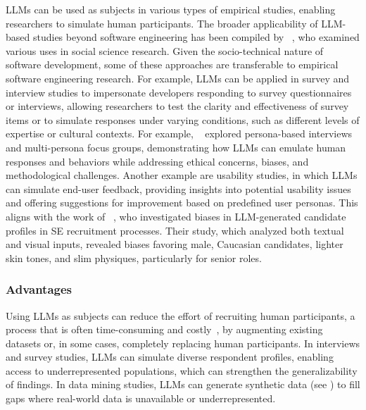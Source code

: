 LLMs can be used as subjects in various types of empirical studies, enabling researchers to simulate human participants.
The broader applicability of LLM-based studies beyond software engineering has been compiled by \citeauthor{DBLP:journals/ipm/XuSRGPLSH24}~\cite{DBLP:journals/ipm/XuSRGPLSH24}, who examined various uses in social science research.
Given the socio-technical nature of software development, some of these approaches are transferable to empirical software engineering research.
For example, LLMs can be applied in survey and interview studies to impersonate developers responding to survey questionnaires or interviews, allowing researchers to test the clarity and effectiveness of survey items or to simulate responses under varying conditions, such as different levels of expertise or cultural contexts.
For example, \citeauthor{DBLP:journals/ase/GerosaTSS24}~\cite{DBLP:journals/ase/GerosaTSS24} explored persona-based interviews and multi-persona focus groups, demonstrating how LLMs can emulate human responses and behaviors while addressing ethical concerns, biases, and methodological challenges.
Another example are usability studies, in which LLMs can simulate end-user feedback, providing insights into potential usability issues and offering suggestions for improvement based on predefined user personas. This aligns with the work of \citeauthor{bano2025doessoftwareengineerlook}~\cite{bano2025doessoftwareengineerlook}, who investigated biases in LLM-generated candidate profiles in SE recruitment processes.
Their study, which analyzed both textual and visual inputs, revealed biases favoring male, Caucasian candidates, lighter skin tones, and slim physiques, particularly for senior roles.

\subsubsection{Advantages}

Using LLMs as subjects can reduce the effort of recruiting human participants, a process that is often time-consuming and costly~\cite{DBLP:conf/vl/Madampe0HO24}, by augmenting existing datasets or, in some cases, completely replacing human participants. 
In interviews and survey studies, LLMs can simulate diverse respondent profiles, enabling access to underrepresented populations, which can strengthen the generalizability of findings. 
In data mining studies, LLMs can generate synthetic data (see \synthesis) to fill gaps where real-world data is unavailable or underrepresented.

